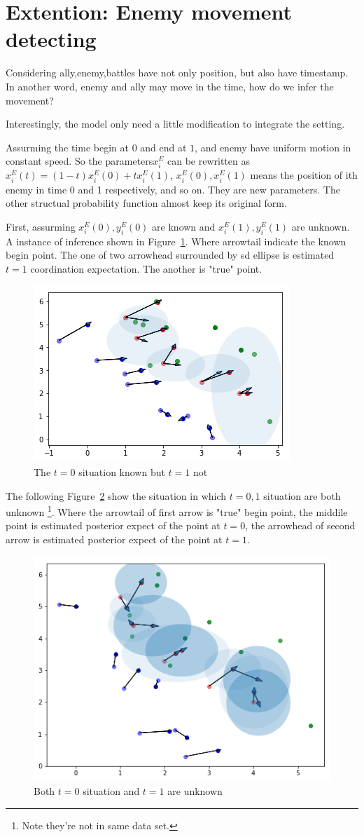 \documentclass{article}
\begin{document}
\section{Extention: Enemy movement detecting}

Considering ally,enemy,battles have not only position, but also have timestamp. In another word,
enemy and ally may move in the time, how do we infer the movement?

Interestingly, the model only need a little modification to integrate the setting.

Assurming the time begin at $0$ and end at $1$, and enemy have uniform motion in constant speed.
So the parameters$x^E_i$ can be rewritten as $x^E_i(t) = (1-t)x^E_i(0) + tx^E_i(1)$, 
$x^E_i(0),x^E_i(1)$ means the position of ith enemy in time 0 and 1 respectively, and so on.
They are new parameters. The other structual probability function almost keep its original form.

First, assurming $x^E_i(0),y^E_i(0)$ are known and $x^E_i(1),y^E_i(1)$ are unknown.
A instance of inference shown in Figure~\ref{fig:bkeu}. Where arrowtail indicate the known begin point.
The one of two arrowhead surrounded by sd ellipse is estimated $t=1$ coordination expectation. 
The another is "true" point.

\begin{figure}[h]
\includegraphics[width=0.4\linewidth]{bkeu.png}
\caption{The $t=0$ situation known but $t=1$ not}
\label{fig:bkeu}
\end{figure}

The following Figure~\ref{fig:bueu} show the situation in which $t=0,1$ situation are both unknown
\footnote{Note they're not in same data set.}. Where the arrowtail of first arrow is "true" begin
point, the middile point is estimated posterior expect of the point at $t=0$, the arrowhead of second arrow
is estimated posterior expect of the point at $t=1$.

\begin{figure}[h]
\includegraphics[width=0.6\linewidth]{bueu.png}
\caption{Both $t=0$ situation and $t=1$ are unknown}
\label{fig:bueu}
\end{figure}
\end{document}
